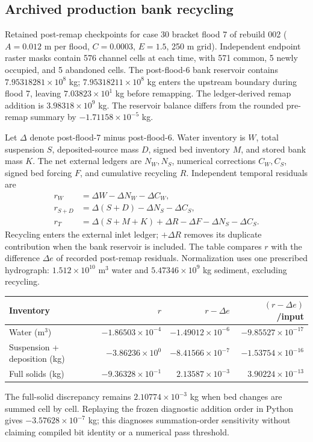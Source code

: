 \subsection{Archived production bank recycling}
Retained post-remap checkpoints for case 30 bracket flood 7 of rebuild 002
($A=0.012$ m per flood, $C=0.0003$, $E=1.5$, 250 m grid).
Independent endpoint raster masks contain 576 channel cells at each time,
with 571 common, 5 newly occupied, and 5 abandoned cells.
The post-flood-6 bank reservoir contains $7.95318281\times10^{8}$ kg;
$7.95318211\times10^{8}$ kg enters the upstream boundary during flood 7, leaving
$7.03823\times10^{1}$ kg before remapping. The ledger-derived remap addition is $3.98318\times10^{9}$ kg.
The reservoir balance differs from the rounded pre-remap summary by $-1.71158\times10^{-5}$ kg.

Let $\Delta$ denote post-flood-7 minus post-flood-6. Water inventory is $W$,
total suspension $S$, deposited-source mass $D$, signed bed inventory $M$,
and stored bank mass $K$. The net external ledgers are $N_W,N_S$,
numerical corrections $C_W,C_S$, signed bed forcing $F$, and cumulative
recycling $R$. Independent temporal residuals are
\begin{align*}
 r_W &= \Delta W-\Delta N_W-\Delta C_W,\\
 r_{S+D} &= \Delta(S+D)-\Delta N_S-\Delta C_S,\\
 r_T &= \Delta(S+M+K)+\Delta R-\Delta F-\Delta N_S-\Delta C_S.
\end{align*}
Recycling enters the external inlet ledger; $+\Delta R$ removes its
duplicate contribution when the bank reservoir is included.
The table compares $r$ with the difference $\Delta e$ of recorded
post-remap residuals. Normalization uses one prescribed hydrograph:
$1.512\times10^{10}$ m$^3$ water and $5.47346\times10^{9}$ kg sediment, excluding recycling.
\begin{center}\small
\begin{tabular}{lrrr}
\toprule
Inventory & $r$ & $r-\Delta e$ & $(r-\Delta e)$/input \\
\midrule
Water (m$^3$) & $-1.86503\times10^{-4}$ & $-1.49012\times10^{-6}$ & $-9.85527\times10^{-17}$ \\
Suspension + deposition (kg) & $-3.86236\times10^{0}$ & $-8.41566\times10^{-7}$ & $-1.53754\times10^{-16}$ \\
Full solids (kg) & $-9.36328\times10^{-1}$ & $2.13587\times10^{-3}$ & $3.90224\times10^{-13}$ \\
\bottomrule\end{tabular}\end{center}
The full-solid discrepancy remains
$2.10774\times10^{-3}$ kg when bed changes are summed cell by cell.
Replaying the frozen diagnostic addition order in Python gives
$-3.57628\times10^{-7}$ kg; this diagnoses summation-order sensitivity without claiming
compiled bit identity or a numerical pass threshold.

